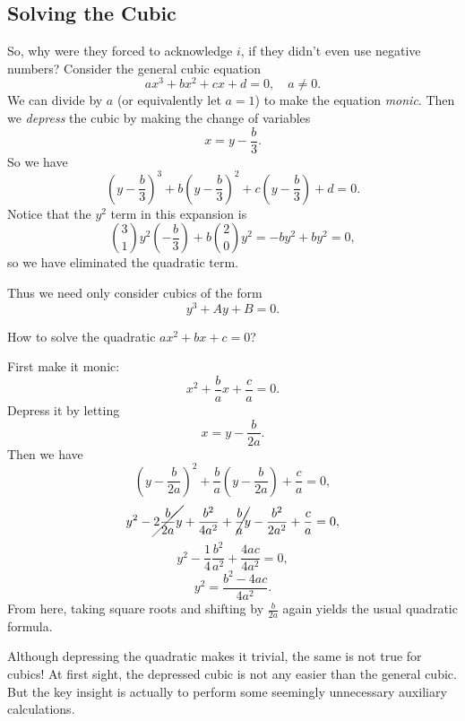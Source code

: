 \subsection{Solving the Cubic}
So, why were they forced to acknowledge $i$, if they
didn't even use negative numbers? Consider the general
cubic equation
\[ax^3 + bx^2 + cx + d = 0, \quad a \ne 0.\]
We can divide by $a$ (or equivalently let $a = 1$) to
make the equation \textit{monic}. Then we \textit{depress}
the cubic by making the change of variables
\[x = y - \frac{b}{3}.\]
So we have
\[\left(y - \frac{b}{3}\right)^3 + b\left(y - \frac{b}{3}\right)^2 + c\left(y - \frac{b}{3}\right) + d= 0.\]
Notice that the $y^2$ term in this expansion is
\[\binom{3}{1}y^2 \left(-\frac{b}{3}\right) + b\binom{2}{0}y^2 = -by^2 + by^2 = 0,\]
so we have eliminated the quadratic term.

Thus we need only consider cubics of the form
\[y^3 + Ay + B = 0.\]

\begin{tcolorbox}[title=Aside: Quadratic equations]
  How to solve  the quadratic $ax^2 + bx + c = 0$?

  First make it monic:
  \[x^2 + \frac{b}{a}x + \frac{c}{a} = 0.\]
  Depress it by letting
  \[
  x = y - \frac{b}{2a}
  .\]
  Then we have
  \[
    \left(y - \frac{b}{2a}\right)^2 + \frac{b}{a}\left(y - \frac{b}{2a}\right) + \frac{c}{a} = 0
  ,\]
  \[
    y^2 - \cancel{2 \frac{b}{2a} y} + \frac{b^2}{4a^2}
  + \cancel{\frac{b}{a} y} - \frac{b^2}{2a^2}
  + \frac{c}{a} = 0
  ,\]
  \[
    y^2 - \frac{1}{4} \frac{b^2}{a^2} + \frac{4ac}{4a^2}
    = 0
  ,\]
  \[
    y^2 = \frac{b^2 - 4ac}{4a^2}
  .\]
  From here, taking square roots and
  shifting by $\frac{b}{2a}$ again yields
  the usual quadratic formula.
\end{tcolorbox}

Although depressing the quadratic makes it trivial, the
same is not true for cubics! At first sight, the depressed
cubic is not any easier than the general cubic.
But the key insight is actually to perform some seemingly
unnecessary auxiliary calculations.

